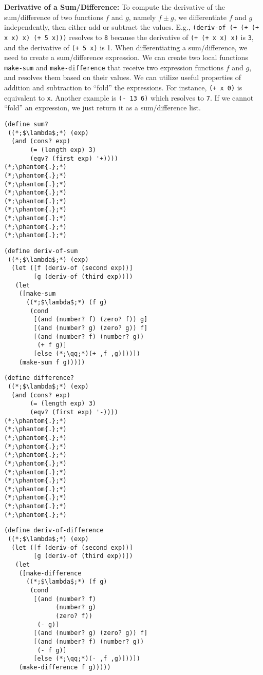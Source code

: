\textbf{Derivative of a Sum/Difference:} To compute the derivative of the sum/difference of two functions $f$ and $g$, namely $f \pm g$, we differentiate $f$ and $g$ independently, then either add or subtract the values. E.g., \texttt{(deriv-of \textquotesingle(+ (+ (+ x x) x) (+ 5 x)))} resolves to \texttt{8} because the derivative of \texttt{(+ (+ x x) x)} is \texttt{3}, and the derivative of \texttt{(+ 5 x)} is 1. When differentiating a sum/difference, we need to create a sum/difference expression. We can create two local functions \texttt{make-sum} and \texttt{make-difference} that receive two expression functions $f$ and $g$, and resolves them based on their values. We can utilize useful properties of addition and subtraction to ``fold'' the expressions. For instance, \texttt{(+ x 0)} is equivalent to \texttt{x}. Another example is \texttt{(- 13 6)} which resolves to \texttt{7}. If we cannot ``fold'' an expression, we just return it as a sum/difference list.

\begin{clrr}[]{}
\begin{lstlisting}[language=MyScheme]
(define sum?
 ((*;$\lambda$;*) (exp)
  (and (cons? exp)
       (= (length exp) 3)
       (eqv? (first exp) '+))))
(*;\phantom{.};*)
(*;\phantom{.};*)
(*;\phantom{.};*)
(*;\phantom{.};*)
(*;\phantom{.};*)
(*;\phantom{.};*)
(*;\phantom{.};*)
(*;\phantom{.};*)
(*;\phantom{.};*)
\end{lstlisting}
\tcblower
\begin{lstlisting}[language=MyNLNScheme]
(define deriv-of-sum
 ((*;$\lambda$;*) (exp)
  (let ([f (deriv-of (second exp))]
        [g (deriv-of (third exp))])
   (let 
    ([make-sum
      ((*;$\lambda$;*) (f g)
       (cond
        [(and (number? f) (zero? f)) g]
        [(and (number? g) (zero? g)) f]
        [(and (number? f) (number? g)) 
         (+ f g)]
        [else (*;\qq;*)(+ ,f ,g)]))])
    (make-sum f g)))))
\end{lstlisting}
\end{clrr}

\begin{clrr}[]{}
\begin{lstlisting}[language=MyScheme]
(define difference?
 ((*;$\lambda$;*) (exp)
  (and (cons? exp)
       (= (length exp) 3)
       (eqv? (first exp) '-))))
(*;\phantom{.};*)
(*;\phantom{.};*)
(*;\phantom{.};*)
(*;\phantom{.};*)
(*;\phantom{.};*)
(*;\phantom{.};*)
(*;\phantom{.};*)
(*;\phantom{.};*)
(*;\phantom{.};*)
(*;\phantom{.};*)
(*;\phantom{.};*)
(*;\phantom{.};*)
\end{lstlisting}
\tcblower
\begin{lstlisting}[language=MyNLNScheme]
(define deriv-of-difference
 ((*;$\lambda$;*) (exp)
  (let ([f (deriv-of (second exp))]
        [g (deriv-of (third exp))])
   (let 
    ([make-difference
      ((*;$\lambda$;*) (f g)
       (cond
        [(and (number? f) 
              (number? g) 
              (zero? f)) 
         (- g)]
        [(and (number? g) (zero? g)) f]
        [(and (number? f) (number? g)) 
         (- f g)]
        [else (*;\qq;*)(- ,f ,g)]))])
    (make-difference f g)))))
\end{lstlisting}
\end{clrr}

